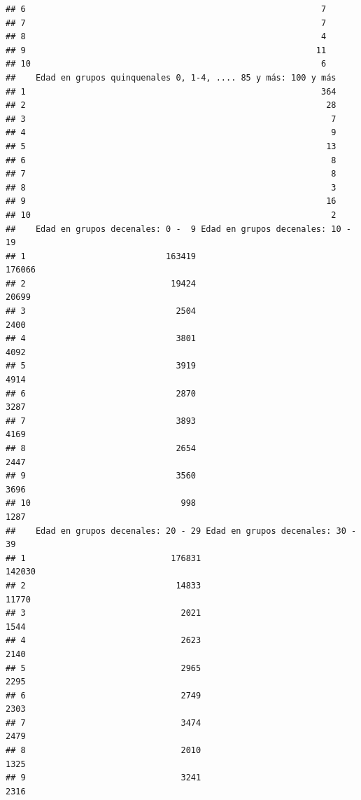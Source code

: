 \documentclass[11pt,]{article}
\begin{document}
\begin{verbatim}
## 6                                                           7
## 7                                                           7
## 8                                                           4
## 9                                                          11
## 10                                                          6
##    Edad en grupos quinquenales 0, 1-4, .... 85 y más: 100 y más
## 1                                                           364
## 2                                                            28
## 3                                                             7
## 4                                                             9
## 5                                                            13
## 6                                                             8
## 7                                                             8
## 8                                                             3
## 9                                                            16
## 10                                                            2
##    Edad en grupos decenales: 0 -  9 Edad en grupos decenales: 10 - 19
## 1                            163419                            176066
## 2                             19424                             20699
## 3                              2504                              2400
## 4                              3801                              4092
## 5                              3919                              4914
## 6                              2870                              3287
## 7                              3893                              4169
## 8                              2654                              2447
## 9                              3560                              3696
## 10                              998                              1287
##    Edad en grupos decenales: 20 - 29 Edad en grupos decenales: 30 - 39
## 1                             176831                            142030
## 2                              14833                             11770
## 3                               2021                              1544
## 4                               2623                              2140
## 5                               2965                              2295
## 6                               2749                              2303
## 7                               3474                              2479
## 8                               2010                              1325
## 9                               3241                              2316

\end{verbatim}
\end{document}

